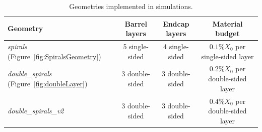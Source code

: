 \begin{table}[htbp]
  \caption{Geometries implemented in simulations.}
  \begin{center}
    \begin{tabular}{ l c c c }
      \hline
      Geometry & Barrel layers & Endcap layers & Material budget \\ \hline \hline
      \emph{spirals} (Figure~\ref{fig:SpiralsGeometry}) & 5 single-sided & 4 single-sided & $0.1\%X_{0}$ per single-sided layer  \\ %
      \emph{double\_spirals} (Figure~\ref{fig:doubleLayer}) & 3 double-sided & 3 double-sided & $0.2\%X_{0}$ per double-sided layer  \\ %
      \emph{double\_spirals\_v2} & 3 double-sided & 3 double-sided & $0.4\%X_{0}$ per double-sided layer  \\ \hline  
    \end{tabular}
  \end{center}
  \label{tab:geometries}
\end{table}


